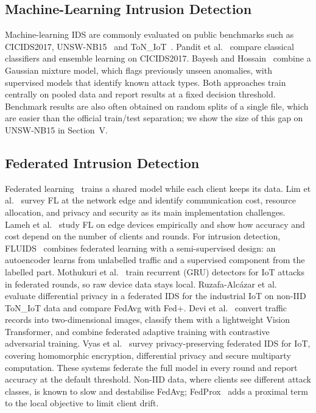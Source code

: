 \documentclass[conference]{IEEEtran}
\begin{document}
\subsection{Machine-Learning Intrusion Detection}
Machine-learning IDS are commonly evaluated on public benchmarks such as
CICIDS2017, UNSW-NB15~\cite{moustafa2015unsw} and ToN\_IoT~\cite{ton_iot}.
Pandit et al.~\cite{pandit2023} compare classical classifiers and ensemble
learning on CICIDS2017. Bayesh and Hossain~\cite{bayesh2024} combine a
Gaussian mixture model, which flags previously unseen anomalies, with
supervised models that identify known attack types. Both approaches train
centrally on pooled data and report results at a fixed decision threshold.
Benchmark results are also often obtained on random splits of a single file,
which are easier than the official train/test separation; we show the size
of this gap on UNSW-NB15 in Section~V.

\subsection{Federated Intrusion Detection}
Federated learning~\cite{mcmahan2017} trains a shared model while each client
keeps its data. Lim et al.~\cite{lim2020} survey FL at the network edge and
identify communication cost, resource allocation, and privacy and security as
its main implementation challenges. Lameh et al.~\cite{lameh2020} study FL on
edge devices empirically and show how accuracy and cost depend on the number
of clients and rounds. For intrusion detection, FLUIDS~\cite{aouedi2022fluids}
combines federated learning with a semi-supervised design: an autoencoder
learns from unlabelled traffic and a supervised component from the labelled
part. Mothukuri et al.~\cite{mothukuri2022} train recurrent (GRU) detectors
for IoT attacks in federated rounds, so raw device data stays local.
Ruzafa-Alc\'{a}zar et al.~\cite{ruzafa2023} evaluate differential privacy in
a federated IDS for the industrial IoT on non-IID ToN\_IoT data and compare
FedAvg with Fed+. Devi et al.~\cite{devi2025fatvit} convert traffic records
into two-dimensional images, classify them with a lightweight Vision
Transformer, and combine federated adaptive training with contrastive
adversarial training. Vyas et al.~\cite{iot_survey} survey privacy-preserving
federated IDS for IoT, covering homomorphic encryption, differential privacy
and secure multiparty computation. These systems federate the full model in
every round and report accuracy at the default threshold. Non-IID data,
where clients see different attack classes, is known to slow and destabilise
FedAvg; FedProx~\cite{li2020fedprox} adds a proximal term to the local
objective to limit client drift.
\end{document}
